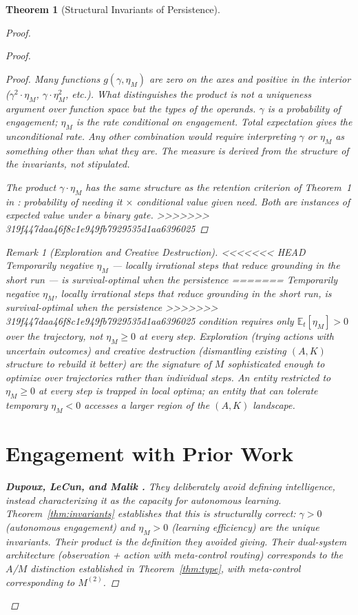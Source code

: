 \documentclass[11pt]{article}
\newtheorem{theorem}{Theorem}
\theoremstyle{definition}
\theoremstyle{remark}
\newtheorem{remark}{Remark}
\begin{document}
\begin{theorem}[Structural Invariants of Persistence]
\begin{proof}
\begin{proof}
\begin{proof}
Many functions $g(\gamma, \eta_M)$ are zero on the axes and positive in
the interior ($\gamma^2 \cdot \eta_M$, $\gamma \cdot \eta_M^2$, etc.).
What distinguishes the product is not a uniqueness argument over
function space but the \emph{types of the operands}. $\gamma$ is a
probability of engagement; $\eta_M$ is the rate conditional on
engagement. Total expectation gives the unconditional rate. Any other
combination would require interpreting $\gamma$ or $\eta_M$ as something
other than what they are. The measure is derived from the structure of
the invariants, not stipulated.

The product $\gamma \cdot \eta_M$ has the same structure as the retention
criterion of Theorem~1 in \cite{McCarthy2026c}: probability of needing
it $\times$ conditional value given need. Both are instances of
expected value under a binary gate.
>>>>>>> 319f447daa46f8c1e949fb7929535d1aa6396025
\end{proof}

\begin{remark}[Exploration and Creative Destruction]
\label{rem:exploration}
<<<<<<< HEAD
Temporarily negative $\eta_M$ --- locally irrational steps that reduce
grounding in the short run --- is survival-optimal when the persistence
=======
Temporarily negative $\eta_M$, locally irrational steps that reduce
grounding in the short run, is survival-optimal when the persistence
>>>>>>> 319f447daa46f8c1e949fb7929535d1aa6396025
condition requires only $\mathbb{E}_t[\eta_M] > 0$ over the trajectory,
not $\eta_M \geq 0$ at every step. Exploration (trying actions with
uncertain outcomes) and creative destruction (dismantling existing
$(A, K)$ structure to rebuild it better) are the signature of $M$
sophisticated enough to optimize over trajectories rather than
individual steps. An entity restricted to $\eta_M \geq 0$ at every step
is trapped in local optima; an entity that can tolerate temporary
$\eta_M < 0$ accesses a larger region of the $(A, K)$ landscape.
\end{remark}

\section{Engagement with Prior Work}
\label{sec:prior}

\textbf{Dupoux, LeCun, and Malik \cite{DupouxLeCunMalik2026}.}
They deliberately avoid defining intelligence, instead characterizing
it as the capacity for autonomous learning. Theorem~\ref{thm:invariants}
establishes that this is structurally correct: $\gamma > 0$ (autonomous
engagement) and $\eta_M > 0$ (learning efficiency) are the unique
invariants. Their product is the definition they avoided giving. Their
dual-system architecture (observation + action with meta-control routing)
corresponds to the $A$/$M$ distinction established in
Theorem~\ref{thm:type}, with meta-control corresponding to $M^{(2)}$.


\end{proof}
\end{proof}
\end{theorem}
\end{document}
